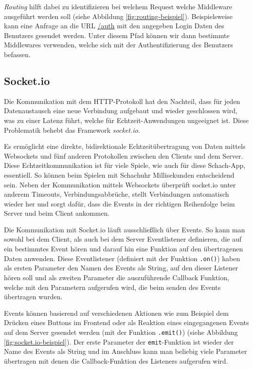 \documentclass[a4paper,12pt]{report}
\begin{document}
\textit{Routing} hilft dabei zu identifizieren bei welchem Request welche Middleware ausgeführt	werden soll (siehe Abbildung \ref{fig:routing-beispiel}). Beispielsweise kann eine Anfrage an die URL \url{/auth} mit den angegeben Login Daten des Benutzers gesendet werden. Unter diesem Pfad können wir dann bestimmte Middlewares verwenden, welche sich mit der Authentifizierung des Benutzers befassen.
        \subsection{Socket.io}
Die Kommunikation mit dem HTTP-Protokoll hat den Nachteil, dass für jeden Datenaustausch eine neue Verbindung aufgebaut und wieder geschlossen wird, was zu einer Latenz führt, welche für Echtzeit-Anwendungen ungeeignet ist. Diese Problematik behebt das Framework \textit{socket.io}. %

Es ermöglicht eine direkte, bidirektionale Echtzeitübertragung von Daten mittels Websockets und fünf anderen Protokollen zwischen den Clients und dem Server. Diese Echtzeitkommunikation ist für viele Spiele, wie auch für diese Schach-App, essentiell. So können beim Spielen mit Schachuhr Millisekunden entscheidend sein.
Neben der Kommunikation mittels Websockets überprüft socket.io unter anderem Timeouts, Verbindungsabbrüche, stellt Verbindungen automatisch wieder her und sorgt dafür, dass die Events in der richtigen Reihenfolge beim Server und beim Client ankommen. 

Die Kommunikation mit Socket.io läuft ausschließlich über Events. So kann man sowohl bei dem Client, als auch bei dem Server Eventlistener definieren, die auf ein bestimmtes Event hören und darauf hin eine Funktion auf den übertragenen Daten anwenden. Diese Eventlistener (definiert mit der Funktion \verb|.on()|) haben als ersten Parameter den Namen des Events als String, auf den dieser Listener hören soll und als zweiten Parameter die auszuführende Callback Funktion, welche mit den Parametern aufgerufen wird, die beim senden des Events übertragen wurden.

Events können basierend auf verschiedenen Aktionen wie zum Beispiel dem Drücken eines Buttons im Frontend oder als Reaktion eines eingegangenen Events auf dem Server gesendet werden (mit der Funktion \verb|.emit()|) (siehe Abbildung \ref{fig:socket.io-beispiel}). Der erste Parameter der \verb|emit|-Funktion ist wieder der Name des Events als String und im Anschluss kann man beliebig viele Parameter übertragen mit denen die Callback-Funktion des Listeners aufgerufen wird.
\end{document}
